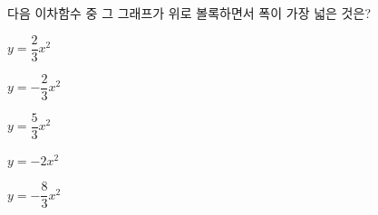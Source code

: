 다음 이차함수 중 그 그래프가 위로 볼록하면서 폭이 가장 넓은 것은?
\begin{choices32}{\rule[-3ex]{0pt}{8ex}$y=\dfrac{2}{3}x^2$}{\rule[-3ex]{0pt}{8ex}$y=-\dfrac{2}{3}x^2$}{\rule[-3ex]{0pt}{8ex}$y=\dfrac{5}{3}x^2$}{\rule[-3ex]{0pt}{8ex}$y=-2x^2$}{\rule[-3ex]{0pt}{8ex}$y=-\dfrac{8}{3}x^2$}\end{choices32}
